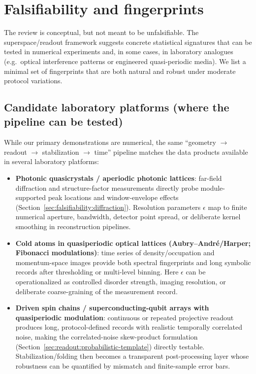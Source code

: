 \section{Falsifiability and fingerprints}\label{sec:falsifiability}

The review is conceptual, but not meant to be unfalsifiable. The superspace/readout framework suggests concrete statistical signatures that can be tested in numerical experiments and, in some cases, in laboratory analogues (e.g.\ optical interference patterns or engineered quasi-periodic media). We list a minimal set of fingerprints that are both natural and robust under moderate protocol variations.

\subsection{Candidate laboratory platforms (where the pipeline can be tested)}\label{sec:falsifiability:platforms}

While our primary demonstrations are numerical, the same ``geometry $\to$ readout $\to$ stabilization $\to$ time'' pipeline matches the data products available in several laboratory platforms:
\begin{itemize}[leftmargin=*,itemsep=2pt]
  \item \textbf{Photonic quasicrystals / aperiodic photonic lattices}: far-field diffraction and structure-factor measurements directly probe module-supported peak locations and window-envelope effects (Section~\ref{sec:falsifiability:diffraction}). Resolution parameters $\epsilon$ map to finite numerical aperture, bandwidth, detector point spread, or deliberate kernel smoothing in reconstruction pipelines.\cite{Lahini2009}
  \item \textbf{Cold atoms in quasiperiodic optical lattices (Aubry--Andr{\'e}/Harper; Fibonacci modulations)}: time series of density/occupation and momentum-space images provide both spectral fingerprints and long symbolic records after thresholding or multi-level binning. Here $\epsilon$ can be operationalized as controlled disorder strength, imaging resolution, or deliberate coarse-graining of the measurement record.\cite{Roati2008}
  \item \textbf{Driven spin chains / superconducting-qubit arrays with quasiperiodic modulation}: continuous or repeated projective readout produces long, protocol-defined records with realistic temporally correlated noise, making the correlated-noise skew-product formulation (Section~\ref{sec:readout:probabilistic-template}) directly testable. Stabilization/folding then becomes a transparent post-processing layer whose robustness can be quantified by mismatch and finite-sample error bars.\cite{SpethmannStanoLoss2025SpinQubitHMM}
\end{itemize}

